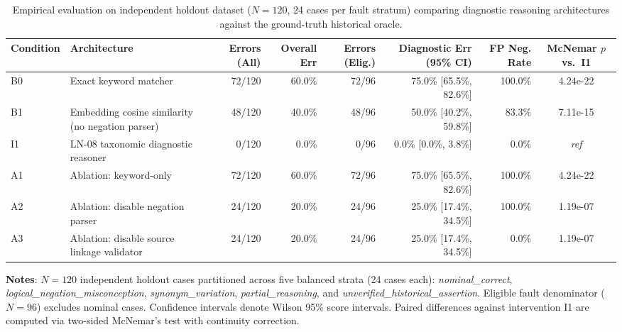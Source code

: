 \begin{table}[t]
\centering
\small
\caption{Empirical evaluation on independent holdout dataset ($N=120$, 24 cases per fault stratum) comparing diagnostic reasoning architectures against the ground-truth historical oracle.}
\label{tab:ln08-holdout-benchmark}
\begin{tabular}{llrrrrrc}
\toprule
Condition & Architecture & Errors (All) & Overall Err & Errors (Elig.) & Diagnostic Err (95\% CI) & FP Neg. Rate & McNemar $p$ vs.\ I1 \\
\midrule
B0 & Exact keyword matcher & 72/120 & 60.0\% & 72/96 & 75.0\% [65.5\%, 82.6\%] & 100.0\% & 4.24e-22 \\
B1 & Embedding cosine similarity (no negation parser) & 48/120 & 40.0\% & 48/96 & 50.0\% [40.2\%, 59.8\%] & 83.3\% & 7.11e-15 \\
I1 & LN-08 taxonomic diagnostic reasoner & 0/120 & 0.0\% & 0/96 & 0.0\% [0.0\%, 3.8\%] & 0.0\% & \textit{ref} \\
A1 & Ablation: keyword-only & 72/120 & 60.0\% & 72/96 & 75.0\% [65.5\%, 82.6\%] & 100.0\% & 4.24e-22 \\
A2 & Ablation: disable negation parser & 24/120 & 20.0\% & 24/96 & 25.0\% [17.4\%, 34.5\%] & 100.0\% & 1.19e-07 \\
A3 & Ablation: disable source linkage validator & 24/120 & 20.0\% & 24/96 & 25.0\% [17.4\%, 34.5\%] & 0.0\% & 1.19e-07 \\
\bottomrule
\end{tabular}
\par\smallskip
\begin{minipage}{0.98\linewidth}\footnotesize
\textbf{Notes}: $N=120$ independent holdout cases partitioned across five balanced strata (24 cases each): \textit{nominal\_correct}, \textit{logical\_negation\_misconception}, \textit{synonym\_variation}, \textit{partial\_reasoning}, and \textit{unverified\_historical\_assertion}. Eligible fault denominator ($N=96$) excludes nominal cases. Confidence intervals denote Wilson 95\% score intervals. Paired differences against intervention I1 are computed via two-sided McNemar's test with continuity correction.
\end{minipage}
\end{table}

